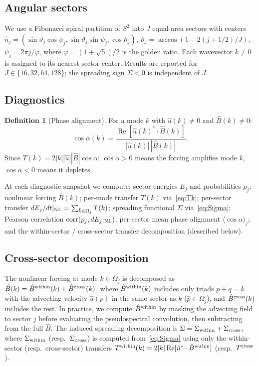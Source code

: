 \documentclass[11pt]{article}
\theoremstyle{definition}
\newtheorem{definition}[theorem]{Definition}
\DeclareMathOperator{\re}{Re}
\DeclareMathOperator{\corr}{corr}
\begin{document}
\subsection{Angular sectors}

We use a Fibonacci spiral partition of $S^2$ into $J$
equal-area sectors with centers
$\hat n_j = (\sin\vartheta_j\cos\psi_j,
\sin\vartheta_j\sin\psi_j,\cos\vartheta_j)$,
$\vartheta_j = \arccos(1-2(j+1/2)/J)$,
$\psi_j = 2\pi j/\varphi$, where
$\varphi = (1+\sqrt{5})/2$ is the golden ratio.
Each wavevector $k\neq 0$ is assigned to its nearest
sector center.  Results are reported for
$J\in\{16,32,64,128\}$; the spreading sign $\Sigma<0$
is independent of $J$.

\subsection{Diagnostics}

\begin{definition}[Phase alignment]
\label{def:phase-align}
For a mode $k$ with $\hat u(k)\neq 0$ and
$\hat B(k)\neq 0$:
\begin{equation}
\cos\alpha(k) = \frac{\re[\hat u(k)^*\cdot\hat B(k)]}
{|\hat u(k)|\,|\hat B(k)|}.
\end{equation}
Since $T(k) = 2|k||\hat u||\hat B|\cos\alpha$:
$\cos\alpha>0$ means the forcing amplifies mode $k$,
$\cos\alpha<0$ means it depletes.
\end{definition}

At each diagnostic snapshot we compute: sector energies
$E_j$ and probabilities $p_j$; nonlinear forcing
$\hat B(k)$; per-mode transfer $T(k)$ via~\eqref{eq:Tk};
per-sector transfer $dE_j/dt|_{\rm NL}
=\sum_{\hat k\in\Omega_j}T(k)$;
spreading functional $\Sigma$ via~\eqref{eq:Sigma};
Pearson correlation $\corr(p_j, dE_j|_{\rm NL})$;
per-sector mean phase alignment
$\langle\cos\alpha\rangle_j$; and the within-sector /
cross-sector transfer decomposition (described below).

\subsection{Cross-sector decomposition}

The nonlinear forcing at mode $k\in\Omega_j$ is
decomposed as $\hat B(k) = \hat B^{\rm within}(k)
+ \hat B^{\rm cross}(k)$, where
$\hat B^{\rm within}(k)$ includes only triads $p+q=k$
with the advecting velocity $\hat u(p)$ in the same
sector as $k$ ($\hat p\in\Omega_j$), and
$\hat B^{\rm cross}(k)$ includes the rest.  In
practice, we compute $\hat B^{\rm within}$ by masking
the advecting field to sector $j$ before evaluating
the pseudospectral convolution, then subtracting from
the full $\hat B$.  The induced spreading decomposition
is $\Sigma = \Sigma_{\rm within}+\Sigma_{\rm cross}$,
where $\Sigma_{\rm within}$ (resp.\ $\Sigma_{\rm cross}$)
is computed from~\eqref{eq:Sigma} using only the
within-sector (resp.\ cross-sector) transfers
$T^{\rm within}(k) = 2|k|\re[\hat u^*\cdot
\hat B^{\rm within}]$ (resp.\ $T^{\rm cross}$).
\end{document}
